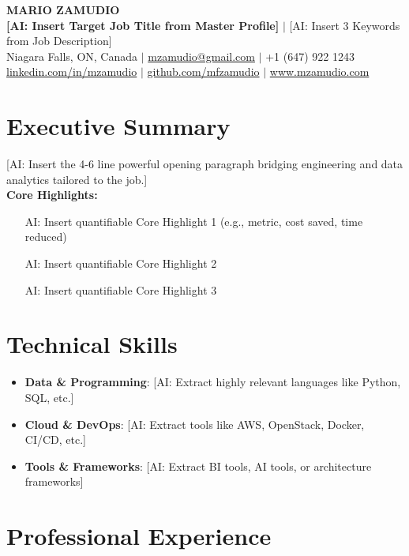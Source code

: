 \documentclass[letterpaper,10pt]{article}
\begin{document}
\begin{center}
{\Huge \textbf{MARIO ZAMUDIO}} \\ \vspace{0.3em}
{\large \textbf{[AI: Insert Target Job Title from Master Profile]} $|$ [AI: Insert 3 Keywords from Job Description]} \\ \vspace{0.3em}
Niagara Falls, ON, Canada $|$ \href{mailto:mzamudio@gmail.com}{mzamudio@gmail.com} $|$ +1 (647) 922 1243 \\
\href{https://linkedin.com/in/mzamudio}{linkedin.com/in/mzamudio} $|$ \href{https://github.com/mfzamudio}{github.com/mfzamudio} $|$ \href{https://www.mzamudio.com}{www.mzamudio.com}
\end{center}

\section*{Executive Summary}
[AI: Insert the 4-6 line powerful opening paragraph bridging engineering and data analytics tailored to the job.]
\vspace{0.5em} \\
\textbf{Core Highlights:}
\begin{itemize}
\item [AI: Insert quantifiable Core Highlight 1 (e.g., metric, cost saved, time reduced)]
\item [AI: Insert quantifiable Core Highlight 2]
\item [AI: Insert quantifiable Core Highlight 3]
\end{itemize}

\section*{Technical Skills}
\begin{itemize}
\item \textbf{Data \& Programming}: [AI: Extract highly relevant languages like Python, SQL, etc.]
\item \textbf{Cloud \& DevOps}: [AI: Extract tools like AWS, OpenStack, Docker, CI/CD, etc.]
\item \textbf{Tools \& Frameworks}: [AI: Extract BI tools, AI tools, or architecture frameworks]
\end{itemize}

\section*{Professional Experience}
\end{document}
